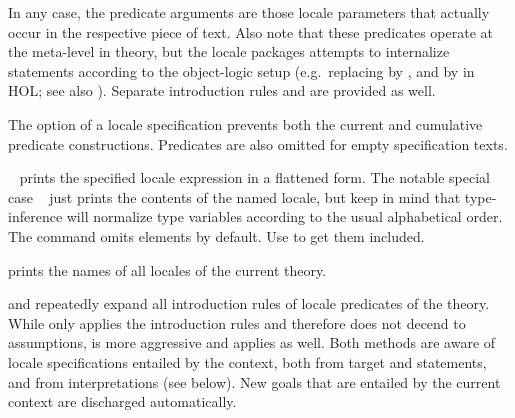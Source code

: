 \begin{isabellebody}
\begin{isamarkuptext}
\begin{descr}
  In any case, the predicate arguments are those locale parameters
  that actually occur in the respective piece of text.  Also note that
  these predicates operate at the meta-level in theory, but the locale
  packages attempts to internalize statements according to the
  object-logic setup (e.g.\ replacing \isa{{\isasymAnd}} by \isa{{\isasymforall}}, and
  \isa{{\isasymLongrightarrow}} by \isa{{\isasymlongrightarrow}} in HOL; see also
  ).  Separate introduction rules  and  are provided as well.
  
  The  option of a locale specification prevents both
  the current  and cumulative  predicate
  constructions.  Predicates are also omitted for empty specification
  texts.

  \item [\mbox{\isa{\isacommand{print{\isacharunderscore}locale}}}~\isa{import\ {\isacharplus}\ body}] prints the
  specified locale expression in a flattened form.  The notable
  special case \mbox{}~ just prints the
  contents of the named locale, but keep in mind that type-inference
  will normalize type variables according to the usual alphabetical
  order.  The command omits \mbox{} elements by default.
  Use \mbox{}\isa{{\isacharbang}} to get them included.

  \item [\mbox{\isa{\isacommand{print{\isacharunderscore}locales}}}] prints the names of all locales
  of the current theory.

  \item [\mbox{\isa{intro{\isacharunderscore}locales}} and \mbox{\isa{unfold{\isacharunderscore}locales}}]
  repeatedly expand all introduction rules of locale predicates of the
  theory.  While \mbox{} only applies the  introduction rules and therefore does not decend to
  assumptions, \mbox{} is more aggressive and applies
   as well.  Both methods are aware of locale
  specifications entailed by the context, both from target and
  \mbox{} statements, and from interpretations (see
  below).  New goals that are entailed by the current context are
  discharged automatically.


\end{descr}
\end{isamarkuptext}
\end{isabellebody}
